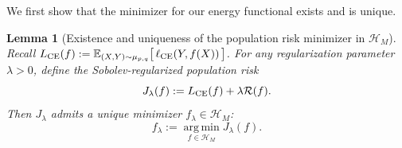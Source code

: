\documentclass[11pt]{article}
\newcommand{\E}{\mathbb{E}}
\newcommand{\cH}{\mathcal{H}}
\theoremstyle{plain}
\newtheorem{lemma}[theorem]{Lemma}
\theoremstyle{definition}
\theoremstyle{remark}
\begin{document}
We first show that the minimizer for our energy functional exists and is unique.
\begin{lemma}[Existence and uniqueness of the population risk minimizer in $\cH_M$]\label{lm: uniq and exist of pop}
Recall $L_{\rm CE}(f):= \E_{(X,Y)\sim\mu_{p,q}}
     \big[\,\ell_{\rm CE}(Y,f(X))\,\big]$. For any regularization parameter $\lambda > 0$, define the Sobolev-regularized population risk
\begin{equation*}
    J_{\lambda}(f):= L_{\rm CE}(f) + \lambda \mathcal{R}(f).
\end{equation*}
Then $J_{\lambda}$ admits a unique minimizer $f_{\lambda} \in \cH_M$:
\begin{equation*}
    f_{\lambda}:= \operatorname*{arg\,min}_{f \in \cH_M }J_{\lambda}(f).
\end{equation*}
\end{lemma}
\end{document}
